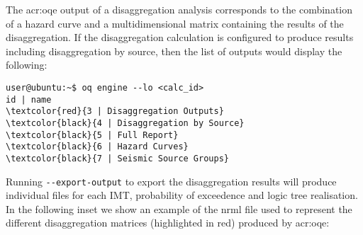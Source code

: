 The \glsdesc{acr:oqe} output of a disaggregation analysis corresponds to the
combination of a hazard curve and a multidimensional matrix containing the
results of the disaggregation. If the disaggregation calculation is configured
to produce results including disaggregation by source, then the list of outputs
would display the following:

\begin{Verbatim}[frame=single, commandchars=\\\{\}, fontsize=\small]
user@ubuntu:~$ oq engine --lo <calc_id>
id | name
\textcolor{red}{3 | Disaggregation Outputs}
\textcolor{black}{4 | Disaggregation by Source}
\textcolor{black}{5 | Full Report}
\textcolor{black}{6 | Hazard Curves}
\textcolor{black}{7 | Seismic Source Groups}
\end{Verbatim}
%

Running \texttt{-{}-export-output} to export the disaggregation results will produce individual files for each IMT, probability of exceedence and logic tree realisation. In the following inset we show an example of the nrml file used to represent the different disaggregation matrices (highlighted in red) produced by
\gls{acr:oqe}:


